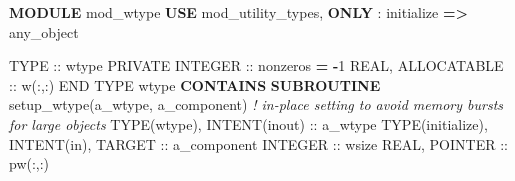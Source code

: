 \documentclass[
  paper=a4,
  ,captions=tableheading
]{scrartcl}
\newenvironment{Shaded}{\begin{snugshade}}{\end{snugshade}}
\newcommand{\CommentTok}[1]{\textcolor[rgb]{0.56,0.35,0.01}{\textit{#1}}}
\newcommand{\DataTypeTok}[1]{\textcolor[rgb]{0.13,0.29,0.53}{#1}}
\newcommand{\DecValTok}[1]{\textcolor[rgb]{0.00,0.00,0.81}{#1}}
\newcommand{\KeywordTok}[1]{\textcolor[rgb]{0.13,0.29,0.53}{\textbf{#1}}}
\newcommand{\NormalTok}[1]{#1}
\newcommand{\OperatorTok}[1]{\textcolor[rgb]{0.81,0.36,0.00}{\textbf{#1}}}
\begin{document}
\begin{Shaded}
\begin{Highlighting}[]
\KeywordTok{MODULE}\NormalTok{ mod\_wtype}
   \KeywordTok{USE}\NormalTok{ mod\_utility\_types, }\KeywordTok{ONLY}\NormalTok{ : initialize }\KeywordTok{=}\OperatorTok{\textgreater{}}\NormalTok{ any\_object}

   \DataTypeTok{TYPE} \DataTypeTok{::}\NormalTok{ wtype}
      \DataTypeTok{PRIVATE}
      \DataTypeTok{INTEGER} \DataTypeTok{::}\NormalTok{ nonzeros }\KeywordTok{=} \KeywordTok{{-}}\DecValTok{1}
      \DataTypeTok{REAL}\NormalTok{, }\DataTypeTok{ALLOCATABLE} \DataTypeTok{::}\NormalTok{ w(:,:)}
   \DataTypeTok{END TYPE}\NormalTok{ wtype}
\KeywordTok{CONTAINS}
   \KeywordTok{SUBROUTINE}\NormalTok{ setup\_wtype(a\_wtype, a\_component)}
      \CommentTok{! in{-}place setting to avoid memory bursts for large objects}
      \DataTypeTok{TYPE(wtype)}\NormalTok{, }\DataTypeTok{INTENT(inout)} \DataTypeTok{::}\NormalTok{ a\_wtype}
      \DataTypeTok{TYPE(initialize)}\NormalTok{, }\DataTypeTok{INTENT(in)}\NormalTok{, }\DataTypeTok{TARGET} \DataTypeTok{::}\NormalTok{ a\_component}
      \DataTypeTok{INTEGER} \DataTypeTok{::}\NormalTok{ wsize}
      \DataTypeTok{REAL}\NormalTok{, }\DataTypeTok{POINTER} \DataTypeTok{::}\NormalTok{ pw(:,:)}


\end{Highlighting}
\end{Shaded}
\end{document}
